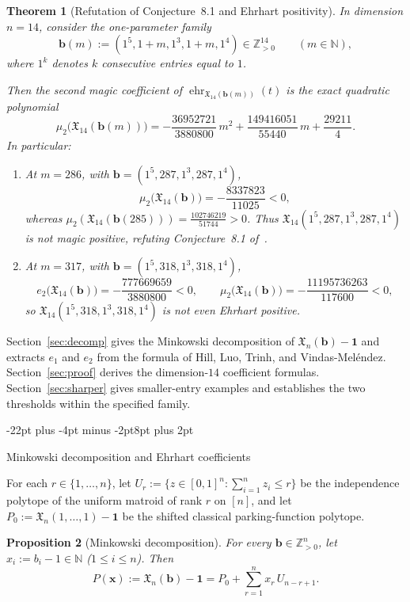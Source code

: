 \documentclass[11pt,letterpaper]{article}
\makeatletter
\renewcommand{\section}{\@startsection{section}{1}{\z@}%
  {-22pt plus -4pt minus -2pt}{8pt plus 2pt}%
  {\normalfont\fontsize{14}{17}\selectfont\bfseries\raggedright}}
\theoremstyle{result}
\newtheorem{theorem}{Theorem}[section]
\newtheorem{proposition}[theorem]{Proposition}
\theoremstyle{remark}
\newcommand{\NN}{\mathbb{N}}
\newcommand{\ZZ}{\mathbb{Z}}
\newcommand{\X}{\mathfrak{X}}
\newcommand{\vb}{\mathbf{b}}
\newcommand{\vx}{\mathbf{x}}
\newcommand{\ehr}{\operatorname{ehr}}
\makeatother
\begin{document}
\begin{theorem}[Refutation of Conjecture~8.1 and Ehrhart positivity]\label{thm:main}
In dimension $n=14$, consider the one-parameter family
\[
\vb(m) := (1^5,1+m,1^3,1+m,1^4) \in \ZZ_{>0}^{14}
\qquad (m\in\NN),
\]
where $1^k$ denotes $k$ consecutive entries equal to $1$.

Then the second magic coefficient of $\ehr_{\X_{14}(\vb(m))}(t)$ is the exact quadratic polynomial
\begin{equation}\label{eq:mu2-quad}
\mu_2\bigl(\X_{14}(\vb(m))\bigr) = -\frac{36952721}{3880800}\,m^2 + \frac{149416051}{55440}\,m + \frac{29211}{4}.
\end{equation}
In particular:
\begin{enumerate}
\item[(a)] At $m=286$, with $\vb=(1^5,287,1^3,287,1^4)$,
\[
\mu_2\bigl(\X_{14}(\vb)\bigr) = -\frac{8337823}{11025} < 0,
\]
whereas $\mu_2(\X_{14}(\vb(285)))=\frac{102746219}{51744}>0$. Thus $\X_{14}(1^5,287,1^3,287,1^4)$ is not magic positive, refuting Conjecture~8.1 of~\cite{HLTV26}.
\item[(b)] At $m=317$, with $\vb=(1^5,318,1^3,318,1^4)$,
\[
e_2\bigl(\X_{14}(\vb)\bigr) = -\frac{777669659}{3880800} < 0,
\qquad
\mu_2\bigl(\X_{14}(\vb)\bigr) = -\frac{11195736263}{117600} < 0,
\]
so $\X_{14}(1^5,318,1^3,318,1^4)$ is not even Ehrhart positive.
\end{enumerate}
\end{theorem}

Section~\ref{sec:decomp} gives the Minkowski decomposition of $\X_n(\vb)-\mathbf{1}$ and extracts $e_1$ and $e_2$ from the formula of Hill, Luo, Trinh, and Vindas-Mel\'endez. Section~\ref{sec:proof} derives the dimension-$14$ coefficient formulas. Section~\ref{sec:sharper} gives smaller-entry examples and establishes the two thresholds within the specified family.

\section{Minkowski decomposition and Ehrhart coefficients}
\label{sec:decomp}

For each $r\in\{1,\dots,n\}$, let $U_r:=\{z\in[0,1]^n : \sum_{i=1}^n z_i\le r\}$ be the independence polytope of the uniform matroid of rank $r$ on $[n]$, and let $P_0:=\X_n(1,\dots,1)-\mathbf{1}$ be the shifted classical parking-function polytope.

\begin{proposition}[Minkowski decomposition]\label{prop:mink}
For every $\vb\in\ZZ_{>0}^n$, let $x_i:=b_i-1\in\NN$ ($1\le i\le n$). Then
\begin{equation}\label{eq:mink}
P(\vx) := \X_n(\vb) - \mathbf{1} = P_0 + \sum_{r=1}^n x_r\, U_{n-r+1}.
\end{equation}
\end{proposition}
\end{document}
